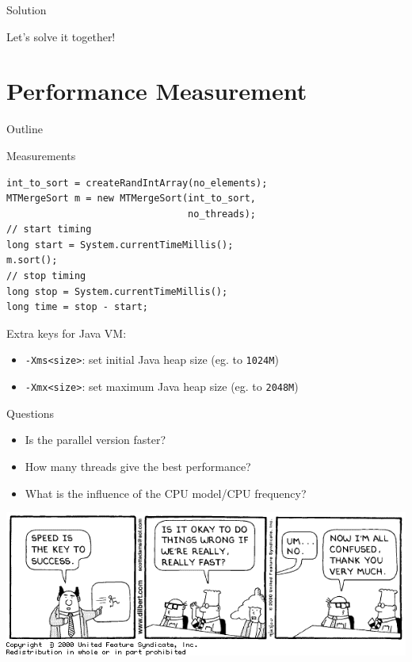 \begin{frame}{Solution}
  \begin{center}
    {\huge Let's solve it together!}
  \end{center}
\end{frame}


\section{Performance Measurement}

\begin{frame}{Outline}
  \tableofcontents[current]
\end{frame}

\begin{frame}[fragile]{Measurements}
\begin{lstlisting}
int_to_sort = createRandIntArray(no_elements);
MTMergeSort m = new MTMergeSort(int_to_sort, 
                                no_threads);
// start timing
long start = System.currentTimeMillis();
m.sort();
// stop timing
long stop = System.currentTimeMillis();
long time = stop - start;
\end{lstlisting}


  Extra keys for Java VM:

  \begin{itemize}
  \item \lstinline!-Xms<size>!: set initial Java heap size (eg. to
    \lstinline!1024M!)
  \item \lstinline!-Xmx<size>!: set maximum Java heap size (eg. to
    \lstinline!2048M!)
  \end{itemize}
\end{frame}

\begin{frame}{Questions}
  \begin{itemize}
  \item Is the parallel version faster?
  \item How many threads give the best performance?
  \item What is the influence of the CPU model/CPU frequency?
  \end{itemize}


  \begin{center}
    \includegraphics[scale=0.35]{figures/dilbert-1}
  \end{center}
\end{frame}

